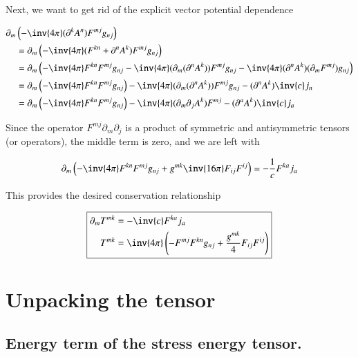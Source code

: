 Next, we want to get rid of the explicit vector potential dependence

\begin{align*}
\partial_m &\left( -\inv{4 \pi } (\partial^k A^n )F^{m j} g_{n j} \right) \\
&=
\partial_m \left( -\inv{4 \pi } (F^{k n} + \partial^n A^k )F^{m j} g_{n j} \right) \\
&=
\partial_m \left( -\inv{4 \pi } F^{k n} F^{m j} g_{n j} 
- \inv{4 \pi} (\partial_m (\partial^n A^k )) F^{m j} g_{n j} 
- \inv{4 \pi} (\partial^n A^k ) (\partial_m F^{m j}) g_{n j} \right) \\
&=
\partial_m \left( -\inv{4 \pi } F^{k n} F^{m j} g_{n j} \right)
- \inv{4 \pi} (\partial_m (\partial^n A^k )) F^{m j} g_{n j} 
- (\partial^n A^k ) \inv{c} j_n \\
&=
\partial_m \left( -\inv{4 \pi } F^{k n} F^{m j} g_{n j} \right)
- \inv{4 \pi} (\partial_m \partial_j A^k ) F^{m j} 
- (\partial^a A^k ) \inv{c} j_a \\
\end{align*}

Since the operator $F^{m j} \partial_m \partial_j$ is a product of symmetric and antisymmetric tensors (or operators), the middle term is zero, and we are left with

\begin{equation}\label{eqn:relativisticElectrodynamicsL22:70}
\partial_m \left(
-\inv{4 \pi } F^{k n} F^{m j} g_{n j} 
+ g^{m k} \inv{16 \pi } F_{i j} F^{i j} 
\right)
= 
- \frac{1}{c} F^{k a} j_a
\end{equation}

This provides the desired conservation relationship

\begin{equation}\label{eqn:relativisticElectrodynamicsL22:90}
\boxed{
\begin{aligned}
\partial_m T^{m k} &= - \inv{c} F^{k a} j_a \\
T^{m k} &=
\inv{4 \pi } \left(
-
F^{m j} 
F^{k n} 
g_{n j} 
+ \frac{g^{m k}}{4} F_{i j} F^{i j} \right)
\end{aligned}
}
\end{equation}

\section{Unpacking the tensor}

\subsection{Energy term of the stress energy tensor.}

